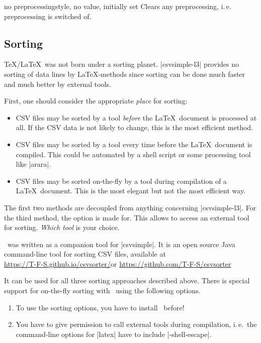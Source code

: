 \documentclass[a4paper,11pt]{ltxdoc}
\begin{document}
\begin{docCsvKey}{no preprocessing}{}{style, no value, initially set}
  Clears any preprocessing, i.\,e. preprocessing is switched of.
\end{docCsvKey}



\clearpage
\subsection{Sorting}\label{sec:Sorting}%
\TeX/\LaTeX\ was not born under a sorting planet. |csvsimple-l3| provides no
sorting of data lines by \LaTeX-methods since sorting can be done much faster
and much better by external tools.

First, one should consider the appropriate \emph{place} for sorting:
\begin{itemize}
\item CSV files may be sorted by a tool \emph{before} the \LaTeX\ document is processed
  at all. If the CSV data is not likely to change, this is the most efficient method.
\item CSV files may be sorted by a tool every time before the \LaTeX\ document is compiled.
  This could be automated by a shell script or some processing tool like |arara|.
\item CSV files may be sorted on-the-fly by a tool during compilation of
  a \LaTeX\ document. This is the most elegant but not the most efficient way.
\end{itemize}

The first two methods are decoupled from anything concerning |csvsimple-l3|.
For the third method, the  option is made for.
This allows to access an external tool for sorting.
\emph{Which tool} is your choice.

\csvsorter\ was written as a companion tool for |csvsimple|.
It is an open source Java command-line tool for sorting CSV files, available at\\
\url{https://T-F-S.github.io/csvsorter/}\quad or\quad
\url{https://github.com/T-F-S/csvsorter}

It can be
used for all three sorting approaches described above.
There is special support for on-the-fly sorting with \csvsorter\ using the
following options.

\begin{enumerate}\bfseries
\item To use the sorting options, you have to install \csvsorter\ before!
\item You have to give permission to call external tools during
  compilation, i.\,e.\ the command-line options for |latex| have to include
  |-shell-escape|.
\end{enumerate}
\end{document}
